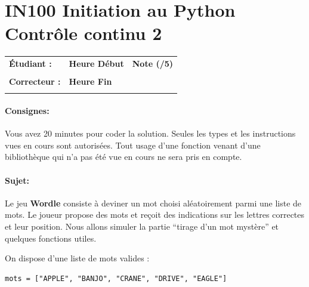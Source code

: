 \documentclass[a4paper,11pt]{article}
\begin{document}
\section*{\center IN100 Initiation au Python\\
Contrôle continu 2}

\vspace*{-0.4 cm}
\begin{table}[h!]
\centering
\renewcommand{\arraystretch}{1.4} %
\begin{tabular}{|p{10cm}|p{3cm}|p{2cm}|}
\hline
\textbf{Étudiant :} & \textbf{Heure Début }  & \textbf{Note (/5) }  \\
& & \\
\hline
\textbf{Correcteur :} & \textbf{Heure Fin } & \\
& & \\
\hline

\hline
\end{tabular}
\end{table}
\vspace*{-0.4 cm}

\paragraph*{Consignes:} Vous avez 20 minutes pour coder la solution. Seules les types et les instructions vues en cours sont autorisées. Tout usage d'une fonction 
venant d'une bibliothèque qui n'a pas été vue en cours ne sera pris en compte. 

\vspace*{-0.2 cm}
\paragraph*{Sujet:}

Le jeu \textbf{Wordle} consiste à deviner un mot  choisi aléatoirement parmi une liste de mots.  
Le joueur propose des mots et reçoit des indications sur les lettres correctes et leur position. Nous allons simuler la partie “tirage d’un mot mystère” et quelques fonctions utiles.

On dispose d’une liste de mots valides : 
\vspace*{-0.2 cm}
\begin{verbatim}
mots = ["APPLE", "BANJO", "CRANE", "DRIVE", "EAGLE"]
\end{verbatim}
\end{document}
